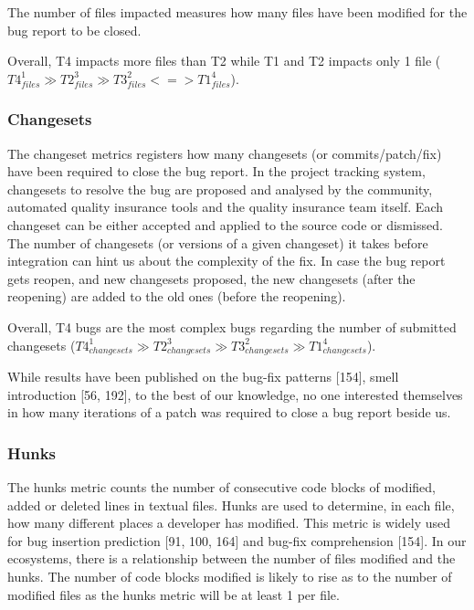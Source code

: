 \documentclass[12pt]{report}
\begin{document}
The number of files impacted measures how many files have been modified
for the bug report to be closed.

Overall, T4 impacts more files than T2 while T1 and T2 impacts only 1
file
(\(T4_{files}^1 \gg T2_{files}^3 \gg T3_{files}^2 < = > T1_{files}^4\)).

\subsubsection{Changesets}\label{changesets}

The changeset metrics registers how many changesets (or
commits/patch/fix) have been required to close the bug report. In the
project tracking system, changesets to resolve the bug are proposed and
analysed by the community, automated quality insurance tools and the
quality insurance team itself. Each changeset can be either accepted and
applied to the source code or dismissed. The number of changesets (or
versions of a given changeset) it takes before integration can hint us
about the complexity of the fix. In case the bug report gets reopen, and
new changesets proposed, the new changesets (after the reopening) are
added to the old ones (before the reopening).

Overall, T4 bugs are the most complex bugs regarding the number of
submitted changesets
(\(T4_{changesets}^1 \gg T2_{changesets}^3 \gg T3_{changesets}^2 \gg T1_{changesets}^4\)).

While results have been published on the bug-fix patterns {[}154{]},
smell introduction {[}56, 192{]}, to the best of our knowledge, no one
interested themselves in how many iterations of a patch was required to
close a bug report beside us.

\subsubsection{Hunks}\label{hunks}

The hunks metric counts the number of consecutive code blocks of
modified, added or deleted lines in textual files. Hunks are used to
determine, in each file, how many different places a developer has
modified. This metric is widely used for bug insertion prediction {[}91,
100, 164{]} and bug-fix comprehension {[}154{]}. In our ecosystems,
there is a relationship between the number of files modified and the
hunks. The number of code blocks modified is likely to rise as to the
number of modified files as the hunks metric will be at least 1 per
file.
\end{document}
